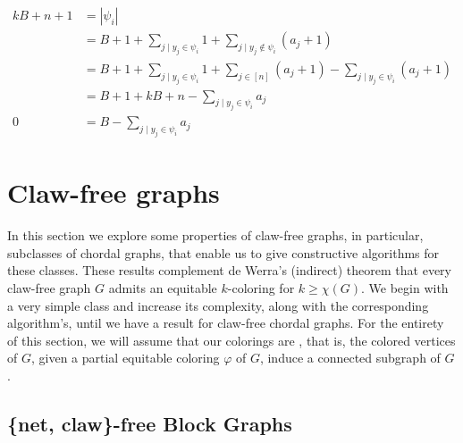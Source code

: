 \begin{tproof}
    \begin{align*}
        kB + n + 1 &= |\psi_i|\\
                   &= B + 1 + \sum_{j \mid y_j \in \psi_i} 1 + \sum_{j \mid y_j \notin \psi_i} (a_j + 1)\\
                   &= B + 1 + \sum_{j \mid y_j \in \psi_i} 1 + \sum_{j \in [n]} (a_j + 1) - \sum_{j \mid y_j \in \psi_i} (a_j + 1) \\
                   &= B + 1 + kB + n - \sum_{j \mid y_j \in \psi_i} a_j \\
                 0 &= B - \sum_{j \mid y_j \in \psi_i} a_j
    \end{align*}
\end{tproof}

\section{Claw-free graphs}

In this section we explore some properties of claw-free graphs, in particular, subclasses of chordal graphs, that enable us to give constructive algorithms for these classes.
These results complement de Werra's (indirect) theorem that every claw-free graph $G$ admits an equitable $k$-coloring for $k \geq \chi(G)$.
We begin with a very simple class and increase its complexity, along with the corresponding algorithm's, until we have a result for claw-free chordal graphs.
For the entirety of this section, we will assume that our colorings are , that is, the colored vertices of $G$, given a partial equitable coloring $\varphi$ of $G$, induce a connected subgraph of $G$.

\subsection{\{net, claw\}-free Block Graphs}

